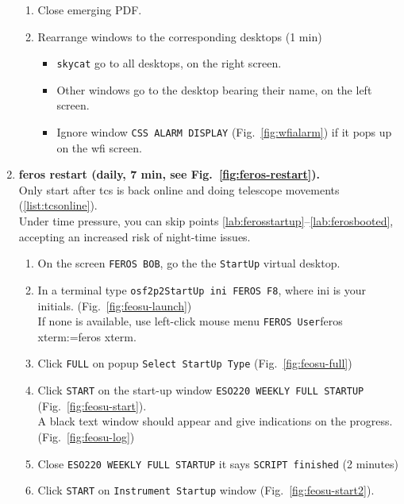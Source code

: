 \documentclass[11pt,fleqn]{book} %
\makeatletter
\def\menu#1#2{\texttt{#1}\ifx{}#2\else\@for\@x:=#2\do{$\rightarrow$\texttt{\@x}}\fi}
\def\mmenu#1#2{left-click mouse menu \menu{#1}{#2}}
\makeatother
\begin{document}
\begin{enumerate}
\begin{enumerate}
          \item Close emerging PDF.
          \item Rearrange windows to the corresponding desktops (1 min)
             \begin{itemize}
                \item \texttt{skycat} go to all desktops, on the right screen.
                \item Other windows go to the desktop bearing their name, on the left screen. 
                \item Ignore window \texttt{CSS ALARM DISPLAY} (Fig.~\ref{fig:wfialarm}) if it pops up on the \gls{wfi} screen.
             \end{itemize}     
        \end{enumerate}
  \item \textbf{\gls{feros} restart (daily, 7 min, see Fig.~\ref{fig:feros-restart}).}\\
        Only start after \gls{tcs} is back online and doing telescope movements (\ref{list:tcsonline}).\\
        Under time pressure, you can skip points \ref{lab:ferosstartup}--\ref{lab:ferosbooted}, accepting an increased risk of night-time issues.
        \label{list:feros}
        \begin{enumerate}
         \item \label{lab:ferosstartup} On the screen \texttt{FEROS BOB},  go the the \texttt{StartUp} virtual desktop.
         \item In a terminal type \texttt{osf2p2StartUp ini FEROS F8}, where ini is your initials. (Fig.~\ref{fig:feosu-launch})\\
               If none is available, use \mmenu{FEROS User}{feros xterm}.
         \item Click \texttt{FULL} on popup \texttt{Select StartUp Type} (Fig.~\ref{fig:feosu-full})
         \item Click \texttt{START} on the start-up window \texttt{ESO220 WEEKLY FULL STARTUP} (Fig.~\ref{fig:feosu-start}).\\
               A black text window should appear and give indications on the progress. (Fig.~\ref{fig:feosu-log})
         \item Close \texttt{ESO220 WEEKLY FULL STARTUP} it says \texttt{SCRIPT finished} (2 minutes)
         \item Click \texttt{START} on \texttt{Instrument Startup} window (Fig.~\ref{fig:feosu-start2}).\\

\end{enumerate}
\end{enumerate}
\end{document}
